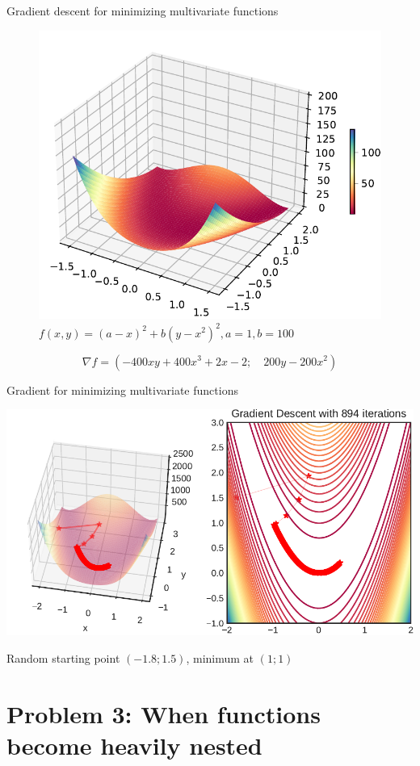 \documentclass[12pt,aspectratio=169,handout]{beamer}
\begin{document}
\begin{frame}{Gradient descent for minimizing multivariate functions}
	
	\begin{figure}
		\centering
		\includegraphics[width=0.40\linewidth]{img/rosenbrock.pdf}
		\caption{$f(x,y)=(a-x)^{2}+b(y-x^{2})^{2}, a = 1, b = 100$}
	\end{figure}
	$$\nabla f = \left(-400xy+400x^3+2x-2; \quad 200y-200x^2 \right)$$
	
\end{frame}

\begin{frame}{Gradient for minimizing multivariate functions}
	
	\includegraphics[width=0.99\linewidth]{img/gradient1.pdf}
	
	
	Random starting point $(-1.8; 1.5)$, minimum at $(1; 1)$
	
\end{frame}

\section{Problem 3: When functions become heavily nested}
\end{document}
